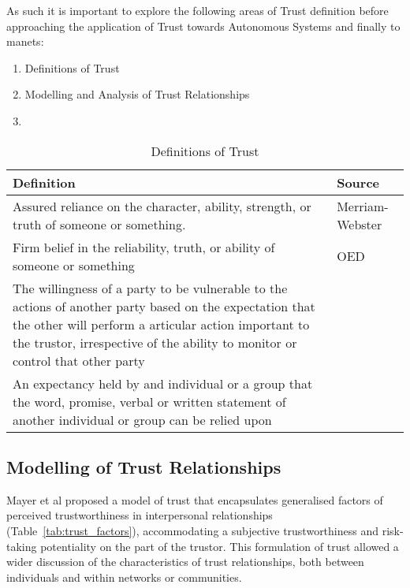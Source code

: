 As such it is important to explore the following areas of Trust definition before approaching the application of Trust towards Autonomous Systems and finally to \acrshort{manet}s:

\begin{enumerate}
  \item Definitions of Trust
  \item Modelling and Analysis of Trust Relationships
  \item 
\end{enumerate}


%
\begin{table}\centering
  \caption{Definitions of Trust}
  \label{tab:trust_definitions}
  \begin{tabularx}{\textwidth}{X p{3cm}}\toprule
    Definition & Source \\ \midrule
    Assured reliance on the character, ability, strength, or truth of someone or something.
    & Merriam-Webster\\
    Firm belief in the reliability, truth, or ability of someone or something & OED\\
    The willingness of a party to be vulnerable to the actions of another party based on the expectation that the other will perform a articular action important to the trustor, irrespective of the ability to monitor or control that other party & \cite{Mayer1995} \\
    An expectancy held by and individual or a group that the word, promise, verbal or written statement of another individual or group can be relied upon & \cite{Rotter1967}\\\bottomrule
  \end{tabularx}
\end{table}
%

\subsection{Modelling of Trust Relationships}
Mayer et al \cite{Mayer1995} proposed a model of trust that encapsulates generalised factors of perceived trustworthiness in interpersonal relationships (Table~\ref{tab:trust_factors}), accommodating a subjective trustworthiness and risk-taking potentiality on the part of the trustor.
This formulation of trust allowed a wider discussion of the characteristics of trust relationships, both between individuals and within networks or communities.

